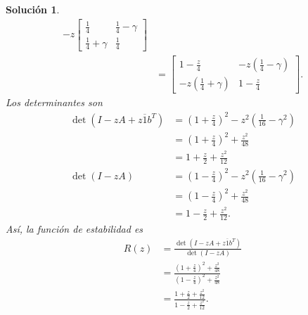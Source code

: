 \documentclass[11pt]{article}
\newtheorem*{sol}{Solución}
\newcommand\ol\overline
\begin{document}
\begin{sol}
\begin{align}
    -z
    \begin{bmatrix}
      \frac{1}{4} & \frac{1}{4} - \gamma \\[3mm]
      \frac{1}{4} + \gamma & \frac{1}{4}
    \end{bmatrix}
    \\
    &=
    \begin{bmatrix}
      1-\frac{z}{4}
        & -z(\frac{1}{4} - \gamma)
        \\[3mm]
      -z(\frac{1}{4} + \gamma)
        & 1-\frac{z}{4}
    \end{bmatrix}
  .\end{align}
  Los determinantes son
  \begin{align}
    \det(I-zA+z\ol 1b^T)
    &= \left(1+\frac{z}{4}\right)^{2}
      - z^{2}\left(\frac{1}{16}-\gamma^{2}\right) \\
    &= \left(1+\frac{z}{4}\right)^{2} + \frac{z^{2}}{48} \\
    &= 1 + \frac{z}{2} + \frac{z^{2}}{12}
    \\
    \det(I-zA)
    &= \left(1-\frac{z}{4}\right)^{2}
      - z^{2}\left(\frac{1}{16} - \gamma^{2}\right) \\
    &= \left(1-\frac{z}{4}\right)^{2} + \frac{z^{2}}{48} \\
    &= 1 - \frac{z}{2} + \frac{z^{2}}{12}
  .\end{align}
  Así, la función de estabilidad es
  \begin{align}
    R(z)
    &= \frac{\det(I-zA+z\ol 1b^T)}{\det(I-zA)}
      \\
    &= \frac
      {\left(1+\frac{z}{4}\right)^{2} + \frac{z^{2}}{48}}
      {\left(1-\frac{z}{4}\right)^{2} + \frac{z^{2}}{48}}
      \\
    &= \frac
      {1 + \frac{z}{2} + \frac{z^{2}}{12}}
      {1 - \frac{z}{2} + \frac{z^{2}}{12}}
  .\end{align}
\end{sol}
\end{document}
